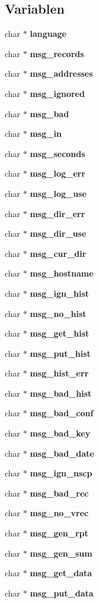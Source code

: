 \subsection*{Variablen}
\begin{CompactItemize}
\item 
char $\ast$ {\bf language}
\item 
char $\ast$ {\bf msg\_\-records}
\item 
char $\ast$ {\bf msg\_\-addresses}
\item 
char $\ast$ {\bf msg\_\-ignored}
\item 
char $\ast$ {\bf msg\_\-bad}
\item 
char $\ast$ {\bf msg\_\-in}
\item 
char $\ast$ {\bf msg\_\-seconds}
\item 
char $\ast$ {\bf msg\_\-log\_\-err}
\item 
char $\ast$ {\bf msg\_\-log\_\-use}
\item 
char $\ast$ {\bf msg\_\-dir\_\-err}
\item 
char $\ast$ {\bf msg\_\-dir\_\-use}
\item 
char $\ast$ {\bf msg\_\-cur\_\-dir}
\item 
char $\ast$ {\bf msg\_\-hostname}
\item 
char $\ast$ {\bf msg\_\-ign\_\-hist}
\item 
char $\ast$ {\bf msg\_\-no\_\-hist}
\item 
char $\ast$ {\bf msg\_\-get\_\-hist}
\item 
char $\ast$ {\bf msg\_\-put\_\-hist}
\item 
char $\ast$ {\bf msg\_\-hist\_\-err}
\item 
char $\ast$ {\bf msg\_\-bad\_\-hist}
\item 
char $\ast$ {\bf msg\_\-bad\_\-conf}
\item 
char $\ast$ {\bf msg\_\-bad\_\-key}
\item 
char $\ast$ {\bf msg\_\-bad\_\-date}
\item 
char $\ast$ {\bf msg\_\-ign\_\-nscp}
\item 
char $\ast$ {\bf msg\_\-bad\_\-rec}
\item 
char $\ast$ {\bf msg\_\-no\_\-vrec}
\item 
char $\ast$ {\bf msg\_\-gen\_\-rpt}
\item 
char $\ast$ {\bf msg\_\-gen\_\-sum}
\item 
char $\ast$ {\bf msg\_\-get\_\-data}
\item 
char $\ast$ {\bf msg\_\-put\_\-data}

\end{CompactItemize}
